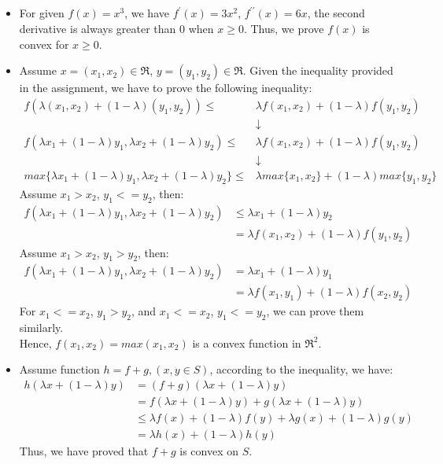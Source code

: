 \documentclass[pdftex,11pt]{article}
\begin{document}
	\subsection{}
	\begin{itemize}
		\item For given $f(x) = x^3$, we have $f^{\prime}(x)=3x^{2}$, $f^{\prime\prime}(x)=6x$, the second derivative is always greater than 0 when $x \geq 0$. Thus, we prove $f(x)$ is convex for $x \geq 0$.
		
		\item Assume $x = (x_{1}, x_{2}) \in \Re$, $y = (y_{1}, y_{2}) \in \Re$. Given the inequality provided in the assignment, we have to prove the following inequality:
		\begin{align*}
		f(\lambda(x_1, x_2) +(1-\lambda)(y_1, y_2)) \leq & \lambda f(x_1, x_2)+(1-\lambda)f(y_1, y_2)\\ 
		& \downarrow \\	
		f(\lambda x_1 + (1 - \lambda)y_1, \lambda x_2 + (1 - \lambda)y_2) \leq & \lambda f(x_1, x_2)+(1-\lambda)f(y_1, y_2)\\ 
		& \downarrow \\
		max\{\lambda x_1+(1-\lambda)y_1, \lambda x_2+(1-\lambda)y_2\} \leq & \lambda max\{x_1, x_2\} +(1-\lambda)max\{ y_1, y_2\} 
		\end{align*}
		Assume $x_1 > x_2$, $y_1 <= y_2$, then:
 		\begin{align*}
 			f(\lambda x_1 + (1 - \lambda)y_1, \lambda x_2 + (1 - \lambda)y_2)
 			& \leq \lambda x_1+ (1 - \lambda)y_2 \\
 			&= \lambda f(x_1, x_2) + (1 - \lambda)f(y_1, y_2)
 		\end{align*}
 		Assume $x_1 > x_2$, $y_1 > y_2$, then:
 		\begin{align*}
			f(\lambda x_1 + (1 - \lambda)y_1, \lambda x_2 + (1 - \lambda)y_2)
 			&= \lambda x_1 + (1 - \lambda)y_1 \\
 			&= \lambda f(x_1, y_1) + (1 - \lambda)f(x_2, y_2)
 		\end{align*} 
		For $x_1 <= x_2$, $y_1 > y_2$, and $x_1 <= x_2$, $y_1 <= y_2$, we can prove them similarly.\\
 		Hence, $f(x_1, x_2) = max(x_1, x_2)$ is a convex function in $\Re^2$.
		
		\item Assume function $h = f + g, (x, y \in S)$, according to the inequality, we have:
		\begin{align*}
			h(\lambda x + (1 - \lambda)y) 
			&=(f + g)(\lambda x + (1 - \lambda)y) \\
			&= f(\lambda x + (1 - \lambda)y) + g(\lambda x + (1 - \lambda)y)\\
 			&\leq \lambda f(x) + (1 - \lambda)f(y) + \lambda g(x) + (1 - \lambda)g(y) \\
 			&= \lambda h(x) + (1 - \lambda)h(y)
 		\end{align*}
		Thus, we have proved that $f+g$ is convex on $S$.
		

\end{itemize}
\end{document}
